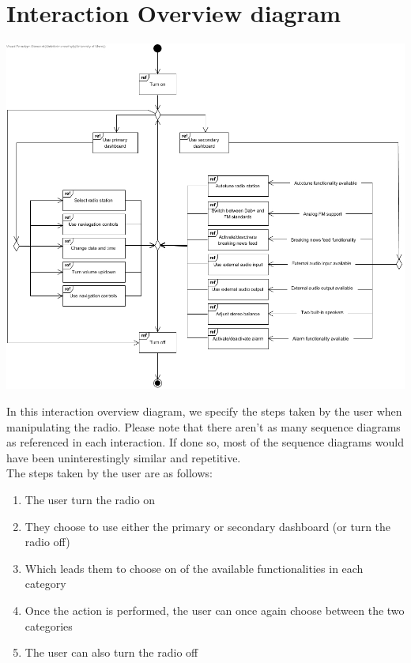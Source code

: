 \documentclass[11pt]{article}
\begin{document}
\pagebreak
\section{Interaction Overview diagram}
\vspace{10px}
\begin{center}
\includegraphics[width=15cm]{../Diagrams/InteractionOverview-v2.jpg}\\
\end{center}
In this interaction overview diagram, we specify the steps taken by the user when manipulating the radio. Please note that there aren't as many sequence diagrams as referenced in each interaction. If done so, most of the sequence diagrams would have been uninterestingly similar and repetitive.\\
The steps taken by the user are as follows:
\begin{enumerate}
\item The user turn the radio on
\item They choose to use either the primary or secondary dashboard (or turn the radio off)
\item Which leads them to choose on of the available functionalities in each category
\item Once the action is performed, the user can once again choose between the two categories
\item The user can also turn the radio off
\end{enumerate}
\end{document}
